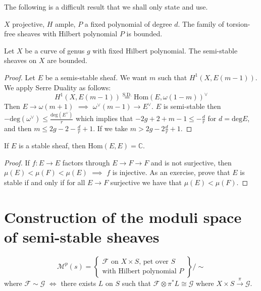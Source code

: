 The following is a difficult result that we shall only state and use.

\begin{theorem}
\label{theorem-}
$X$ projective, $H$ ample, $P$ a fixed polynomial of degree $d$. The family of
torsion-free sheaves with Hilbert polynomial $P$ is bounded.
\end{theorem}

\begin{proposition}
\label{proposition-semi-stable-sheaves-are-bounded-on-curves}
Let $X$ be a curve of genus $g$ with fixed Hilbert polynomial. The semi-stable
sheaves on $X$ are bounded.
\end{proposition}

\begin{proof}
Let $E$ be a semis-stable sheaf. We want $m$ such that $H^{1}(X,E(m-1))$. We
apply Serre Duality as follows:
$$
H^{1}(X,E(m-1))\overset{\text{S.D.}}{=}\text{Hom}(E,\omega(1-m))^\vee
$$Then $E \to \omega(m+1)$ $\implies$ $\omega^\vee(m-1)\to E^\vee$. $E$ is
semi-stable then $-\text{deg}(\omega^\vee)\leq \frac{\text{deg}(E^\vee)}{r}$
which implies that $-2g+2+m-1\leq -\frac{d}{r}$ for $d=\text{deg}E$, and then
$m\leq  2g-2-\frac{d}{r}+1$. If we take $m>2g-2\frac{d}{r}+1$.
\end{proof}

\begin{proposition}
\label{proposition-}
If  $E$ is a stable sheaf, then $\text{Hom}(E,E)=\mathbb{C}$.
\end{proposition}

\begin{proof}
If $f:E \to E$ factors through $E \to F \to F$ and is not surjective, then
$\mu(E)<\mu(F)<\mu(E)$ $\implies$ $f$ is injective. As an exercise, prove that
$E$ is stable if and only if for all $E \to F$ surjective we have that
$\mu(E)<\mu(F)$.
\end{proof}

\section*{Construction of the moduli space of semi-stable sheaves}
\label{section-construction-of-the-moduli-space-of-semi-stable-sheaves}
$$
\mathcal{M}^p(s)=\left\{ \substack{\text{$\mathcal{F}$ on $X\times S$,
pet over $S$}
 \\ \text{with Hilbert polynomial $P$}} \right\} \Big/\sim
$$
where $\mathcal{F}\sim \mathcal{G}$ $\iff$ there exists $L$ on $S$ such that
$\mathcal{F}\otimes \pi^*L \cong \mathcal{G}$ where 
$X \times S\xrightarrow{\pi}\mathcal{G}$.

